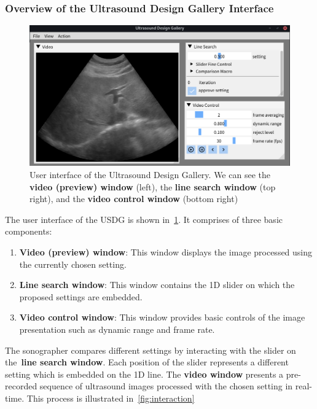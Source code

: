 \subsubsection{Overview of the Ultrasound Design Gallery Interface}
%
\begin{figure}[t]
  \centering
  \includegraphics[scale=0.30]{figures/ui.png}
  \caption{User interface of the Ultrasound Design Gallery. We can see the \textbf{video (preview) window} (left), the \textbf{line search window} (top right), and the \textbf{video control window} (bottom right) }\label{fig:ui}
\end{figure}
%
The user interface of the USDG is shown in~\cref{fig:ui}.
It comprises of three basic components:
\begin{enumerate}
  \item[\ding{228}] \textbf{Video (preview) window}: This window displays the image processed using the currently chosen setting.
  \item[\ding{228}] \textbf{Line search window}: This window contains the 1D slider on which the proposed settings are embedded.
  \item[\ding{228}] \textbf{Video control window}: This window provides basic controls of the image presentation such as dynamic range and frame rate.
\end{enumerate}
The sonographer compares different settings by interacting with the slider on the~\textbf{line search window}.
Each position of the slider represents a different setting which is embedded on the 1D line.
The \textbf{video window} presents a pre-recorded sequence of ultrasound images processed with the chosen setting in real-time.
This process is illustrated in~\cref{fig:interaction}

